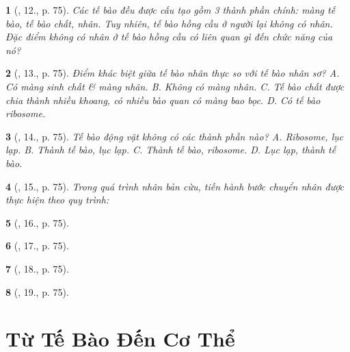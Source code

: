 \documentclass{article}
\newtheorem{baitoan}{}
\begin{document}
\begin{baitoan}[\cite{ncpt_KHTN_6_tap_1}, 12., p. 75]
	Các tế bào đều được cấu tạo gồm 3 thành phần chính: màng tế bào, tế bào chất, nhân. Tuy nhiên, tế bào hồng cầu ở người lại không có nhân. Đặc điểm không có nhân ở tế bào hồng cầu có liên quan gì đến chức năng của nó?
\end{baitoan}

\begin{baitoan}[\cite{ncpt_KHTN_6_tap_1}, 13., p. 75]
	Điểm khác biệt giữa tế bào nhân thực so với tế bào nhân sơ? {\sf A.} Có màng sinh chất \& màng nhân. {\sf B.} Không có màng nhân. {\sf C.} Tế bào chất được chia thành nhiều khoang, có nhiều bào quan có màng bao bọc. {\sf D.} Có tế bào ribosome.
\end{baitoan}

\begin{baitoan}[\cite{ncpt_KHTN_6_tap_1}, 14., p. 75]
	Tế bào động vật không có các thành phần nào? {\sf A.} Ribosome, lục lạp. {\sf B.} Thành tế bào, lục lạp. {\sf C.} Thành tế bào, ribosome. {\sf D.} Lục lạp, thành tế bào.
\end{baitoan}

\begin{baitoan}[\cite{ncpt_KHTN_6_tap_1}, 15., p. 75]
	Trong quá trình nhân bản cừu, tiến hành bước chuyển nhân được thực hiện theo quy trình:
\end{baitoan}

\begin{baitoan}[\cite{ncpt_KHTN_6_tap_1}, 16., p. 75]
	
\end{baitoan}

\begin{baitoan}[\cite{ncpt_KHTN_6_tap_1}, 17., p. 75]
	
\end{baitoan}

\begin{baitoan}[\cite{ncpt_KHTN_6_tap_1}, 18., p. 75]
	
\end{baitoan}

\begin{baitoan}[\cite{ncpt_KHTN_6_tap_1}, 19., p. 75]
	
\end{baitoan}


\section{Từ Tế Bào Đến Cơ Thể}
\end{document}
